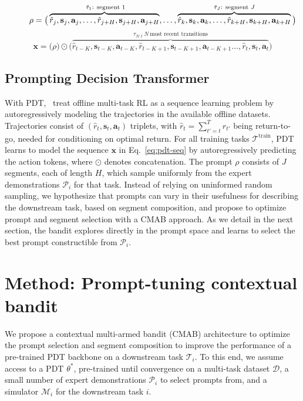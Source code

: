 \documentclass{article}
\begin{document}
\begin{figure*}[]
\begin{equation}
        \rho = \big(
        \overbrace{
        \hat{r}_j, \mathbf{s}_j, \mathbf{a}_j, 
        \dots,
        \hat{r}_{j+H}, \mathbf{s}_{j+H}, \mathbf{a}_{j+H}}
        ^{\text{ $\Tilde{\tau}_1$: segment 1}},
        \dots,
        \overbrace{
        \hat{r}_k, \mathbf{s}_k, \mathbf{a}_k, 
        \dots,
        \hat{r}_{k+H}, \mathbf{s}_{k+H}, \mathbf{a}_{k+H}}
        ^{\text{$\Tilde{\tau}_J$: segment } J}
        \big)
    \label{eq:pdt}
\end{equation}
\begin{equation}
    \mathbf{x} = 
        \big( \rho \big) \odot
        \big(
        \overbrace{
        \hat{r}_{t-K}, \mathbf{s}_{t-K}, \mathbf{a}_{t-K}, 
        \hat{r}_{t-K+1}, \mathbf{s}_{t-K+1}, \mathbf{a}_{t-K+1}
        \dots,
        \hat{r}_{t}, \mathbf{s}_{t}, \mathbf{a}_{t}
        }^{\tau_{N:t}\: N\  \text{most recent transitions}}
        \big)
    \label{eq:pdt-seq}
\end{equation}
\end{figure*}
\subsection{Prompting Decision Transformer}\label{sec:pdt}
With PDT,~\citet{xu2022prompting} treat offline multi-task RL as a sequence learning problem by autoregressively modeling the trajectories in the available offline datasets. 
Trajectories consist of $(\hat{r}_t, \mathbf{s}_t, \mathbf{a}_t)$ triplets, with $\hat{r}_t = \sum^T_{t'=t} r_{t'}$ being return-to-go, needed for conditioning on optimal return. 
For all training tasks $\mathcal{T}^\text{train}$, PDT learns to model the sequence $\mathbf{x}$ in Eq.~\eqref{eq:pdt-seq} by autoregressively predicting the action tokens, where $\odot$ denotes concatenation.
The prompt $\rho$ consists of $J$ segments, each of length $H$, which \citet{xu2022prompting} sample uniformly from the expert demonstrations $\mathcal{P}_i$ for that task.
Instead of relying on uninformed random sampling, we hypothesize that prompts can vary in their usefulness for describing the downstream task, based on segment composition, and propose to optimize prompt and segment selection with a CMAB approach.
As we detail in the next section, the bandit explores directly in the prompt space and learns to select the best prompt constructible from $\mathcal{P}_i$.
        
\section{Method: Prompt-tuning contextual bandit}\label{sec:method}
We propose a contextual multi-armed bandit (CMAB) architecture to optimize the prompt selection and segment composition to improve the performance of a pre-trained PDT backbone on a downstream task $\mathcal{T}_i$. 
To this end, we assume access to a PDT $\theta^*$, pre-trained until convergence on a multi-task dataset $\mathcal{D}$, a small number of expert demonstrations $\mathcal{P}_i$ to select prompts from, and a simulator $\mathcal{M}_i$ for the downstream task $i$.
\end{document}
